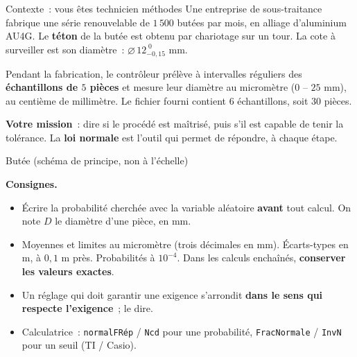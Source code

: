\documentclass[a4paper,11pt]{article}
\begin{document}
\begin{exo}{Contexte~: vous êtes technicien méthodes}
Une entreprise de sous-traitance fabrique une série renouvelable de $1\,500$ butées par mois, en alliage d'aluminium AU4G. Le \textbf{téton} de la butée est obtenu par chariotage sur un tour. La cote à surveiller est son diamètre~: $\varnothing\,12^{\;0}_{-0{,}15}$ mm.

\smallskip
\begin{minipage}[c]{0.56\linewidth}
Pendant la fabrication, le contrôleur prélève à intervalles réguliers des \textbf{échantillons de $5$ pièces} et mesure leur diamètre au micromètre ($0$ -- $25$ mm), au centième de millimètre. Le fichier fourni contient $6$ échantillons, soit $30$ pièces.

\smallskip
\textbf{Votre mission}~: dire si le procédé est maîtrisé, puis s'il est capable de tenir la tolérance. La \textbf{loi normale} est l'outil qui permet de répondre, à chaque étape.
\end{minipage}\hfill
\begin{minipage}[c]{0.40\linewidth}\centering
{}

{\scriptsize Butée (schéma de principe, non à l'échelle)}
\end{minipage}
\end{exo}

\begin{consigne}\small
\textbf{Consignes.}
\begin{itemize}[leftmargin=12pt, itemsep=0pt, topsep=2pt]
  \item Écrire la probabilité cherchée avec la variable aléatoire \textbf{avant} tout calcul. On note $D$ le diamètre d'une pièce, en mm.
  \item Moyennes et limites au micromètre (trois décimales en mm). Écarts-types en \textmu m, à $0{,}1$ \textmu m près. Probabilités à $10^{-4}$. Dans les calculs enchaînés, \textbf{conserver les valeurs exactes}.
  \item Un réglage qui doit garantir une exigence s'arrondit \textbf{dans le sens qui respecte l'exigence}~; le dire.
  \item Calculatrice~: \texttt{normalFRép} / \texttt{Ncd} pour une probabilité, \texttt{FracNormale} / \texttt{InvN} pour un seuil (TI / Casio).
\end{itemize}
\end{consigne}
\end{document}
